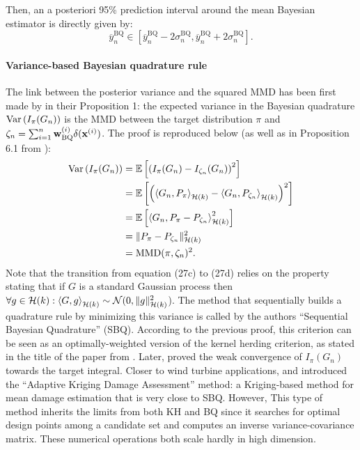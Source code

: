 \noindent Then, an a posteriori 95\% prediction interval around the mean Bayesian estimator is directly given by: 
\begin{equation}
   \overline{y}_n^{\mathrm{BQ}} \in \left[\overline{y}_n^{\mathrm{BQ}} - 2\sigma_n^{\mathrm{BQ}}, \overline{y}_n^{\mathrm{BQ}} + 2\sigma_n^{\mathrm{BQ}} \right].
\end{equation}

\paragraph{Variance-based Bayesian quadrature rule}%
The link between the posterior variance and the squared MMD has been first made by \cite{husar_duvenaud_2012} in their Proposition 1: the expected variance in the Bayesian quadrature $\operatorname{Var}\left(I_{\pi}(G_n)\right)$ is the MMD between the target distribution $\pi$ and $\zeta_n = \sum_{i=1}^n \mathbf{w}_{\mathrm{BQ}}^{(i)} \delta({\bf x}^{(i)})$. 
The proof is reproduced below (as well as in Proposition 6.1 from \cite{motonobu_2018}): 
\begin{subequations}
\begin{align}
    \operatorname{Var}\left(I_{\pi}(G_n)\right) &= \mathbb{E}\left[ \left(I_{\pi}(G_n) - I_{\zeta_n}(G_n)\right)^2\right]\\
    &= \mathbb{E}\left[ \left( \left\langle G_n, P_{\pi} \right\rangle_{\mathcal{H}(k)} - \left\langle G_n, P_{\zeta_n}\right\rangle_{\mathcal{H}(k)} \right)^2\right]\\
    &= \mathbb{E}\left[ \left\langle G_n, P_{\pi} - P_{\zeta_n} \right\rangle_{\mathcal{H}(k)}^2\right]\\
    &= \lVert P_{\pi} - P_{\zeta_n} \lVert^2_{\mathcal{H}(k)}\\ 
    &= \mathrm{MMD}(\pi, \zeta_n)^2.
\end{align}
\end{subequations}
Note that the transition from equation (27c) to (27d) relies on the property stating that if $G$ is a standard Gaussian process then $\forall g \in \mathcal{H}(k) : \left\langle G, g \right\rangle_{\mathcal{H}(k)} \sim \mathcal{N}(0, \lVert g \lVert^2_{\mathcal{H}(k)}$). 
The method that sequentially builds a quadrature rule by minimizing this variance is called by the authors ``Sequential Bayesian Quadrature'' (SBQ). 
According to the previous proof, this criterion can be seen as an optimally-weighted version of the kernel herding criterion, as stated in the title of the paper from \cite{husar_duvenaud_2012}. 
Later, \cite{briol_2015} proved the weak convergence of $I_{\pi}(G_n)$ towards the target integral. 
Closer to wind turbine applications, \cite{huchet_2019} and \cite{huchet_mattrand_2019} introduced the ``Adaptive Kriging Damage Assessment'' method: a Kriging-based method for mean damage estimation that is very close to SBQ. 
However, This type of method inherits the limits from both KH and BQ since it searches for optimal design points among a candidate set and computes an inverse variance-covariance matrix. 
These numerical operations both scale hardly in high dimension. 

